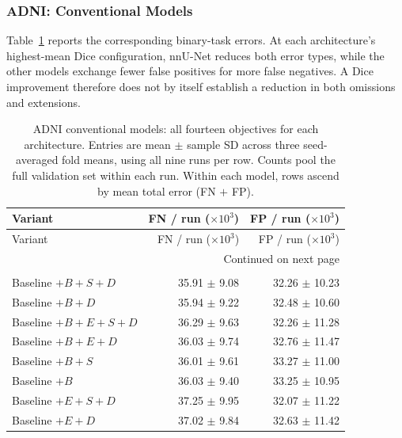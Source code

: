 \documentclass[12pt,a4paper]{article}
\begin{document}
\subsubsection{ADNI: Conventional Models}

Table~\ref{tab:adni-all-errors} reports the corresponding binary-task
errors. At each architecture's highest-mean Dice configuration, nnU-Net
reduces both error types, while the other models exchange fewer false
positives for more false negatives. A Dice improvement therefore does
not by itself establish a reduction in both omissions and extensions.

\begingroup\footnotesize{}
\setlength{\tabcolsep}{4pt}
\renewcommand{\arraystretch}{1.12}
\begin{longtable}{@{}lrr@{}}
\caption{ADNI conventional models: all fourteen objectives for each architecture. Entries are mean $\pm$ sample SD across three seed-averaged fold means, using all nine runs per row. Counts pool the full validation set within each run. Within each model, rows ascend by mean total error (FN $+$ FP).}
\label{tab:adni-all-errors}\\
\hline
Variant & \shortstack{FN / run\\($\times 10^{3}$)} & \shortstack{FP / run\\($\times 10^{3}$)} \\ \hline
\endfirsthead
\hline
Variant & \shortstack{FN / run\\($\times 10^{3}$)} & \shortstack{FP / run\\($\times 10^{3}$)} \\ \hline
\endhead
\hline
\multicolumn{3}{r}{Continued on next page}\\
\endfoot
\hline\endlastfoot
\multicolumn{3}{@{}l}{\textbf{nnU-Net}}\\*
Baseline $+B+S+D$ & 35.91 $\pm$ 9.08 & 32.26 $\pm$ 10.23 \\
Baseline $+B+D$ & 35.94 $\pm$ 9.22 & 32.48 $\pm$ 10.60 \\
Baseline $+B+E+S+D$ & 36.29 $\pm$ 9.63 & 32.26 $\pm$ 11.28 \\
Baseline $+B+E+D$ & 36.03 $\pm$ 9.74 & 32.76 $\pm$ 11.47 \\
Baseline $+B+S$ & 36.01 $\pm$ 9.61 & 33.27 $\pm$ 11.00 \\
Baseline $+B$ & 36.03 $\pm$ 9.40 & 33.25 $\pm$ 10.95 \\
Baseline $+E+S+D$ & 37.25 $\pm$ 9.95 & 32.07 $\pm$ 11.22 \\
Baseline $+E+D$ & 37.02 $\pm$ 9.84 & 32.63 $\pm$ 11.42 \\

\end{longtable}
\end{document}
